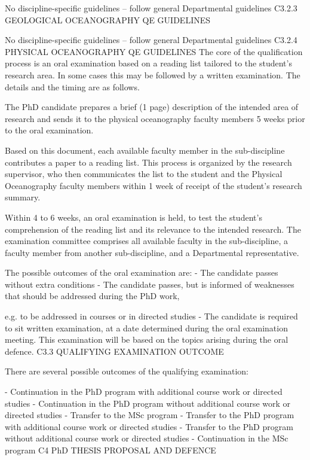 No discipline-specific guidelines – follow general Departmental guidelines
C3.2.3  GEOLOGICAL OCEANOGRAPHY QE GUIDELINES

No discipline-specific guidelines – follow general Departmental guidelines
C3.2.4  PHYSICAL OCEANOGRAPHY QE GUIDELINES
The core of the qualification process is an oral examination based on a reading list tailored to the student’s research area. In some cases this may be followed by a written examination. The details and the timing are as follows.

The PhD candidate prepares a brief (1 page) description of the intended area of research and sends it to the physical oceanography faculty members 5 weeks prior to the oral examination.

Based on this document, each available faculty member in the sub-discipline contributes a paper to a reading list. This process is organized by the research supervisor, who then communicates the list to the student and the Physical Oceanography faculty members within 1 week of receipt of the student’s research summary.

Within 4 to 6 weeks, an oral examination is held, to test the student’s comprehension of the reading list and its relevance to the intended research. The examination committee comprises all available faculty in the sub-discipline, a faculty member from another sub-discipline, and a Departmental representative.

The possible outcomes of the oral examination are:
-	The candidate passes without extra conditions
-	The candidate passes, but is informed of weaknesses that should be addressed during the PhD work,
 

e.g. to be addressed in courses or in directed studies
-	The candidate is required to sit written examination, at a date determined during the oral examination meeting. This examination will be based on the topics arising during the oral defence.
C3.3	QUALIFYING EXAMINATION OUTCOME

There are several possible outcomes of the qualifying examination:

-	Continuation in the PhD program with additional course work or directed studies
-	Continuation in the PhD program without additional course work or directed studies
-	Transfer to the MSc program
-	Transfer to the PhD program with additional course work or directed studies
-	Transfer to the PhD program without additional course work or directed studies
-	Continuation in the MSc program
C4	PhD THESIS PROPOSAL AND DEFENCE

